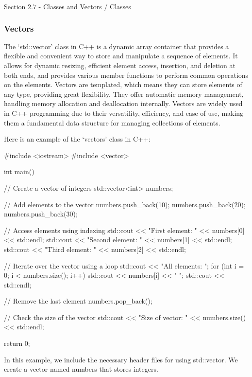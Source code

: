 \begin{notes}{Section 2.7 - Classes and Vectors / Classes}
    \subsubsection*{Vectors}

    The `std::vector' class in C++ is a dynamic array container that provides a flexible and convenient way to store and manipulate a sequence of elements. It allows for dynamic resizing, efficient element access, insertion, and deletion 
    at both ends, and provides various member functions to perform common operations on the elements. Vectors are templated, which means they can store elements of any type, providing great flexibility. They offer automatic memory management, 
    handling memory allocation and deallocation internally. Vectors are widely used in C++ programming due to their versatility, efficiency, and ease of use, making them a fundamental data structure for managing collections of elements.
    
    \begin{highlight}
        Here is an example of the `vectors' class in C++:
    \begin{code}[C++]
    #include <iostream>
    #include <vector>
    
    int main() {
        // Create a vector of integers
        std::vector<int> numbers;
    
        // Add elements to the vector
        numbers.push_back(10);
        numbers.push_back(20);
        numbers.push_back(30);
    
        // Access elements using indexing
        std::cout << "First element: " << numbers[0] << std::endl;
        std::cout << "Second element: " << numbers[1] << std::endl;
        std::cout << "Third element: " << numbers[2] << std::endl;
    
        // Iterate over the vector using a loop
        std::cout << "All elements: ";
        for (int i = 0; i < numbers.size(); i++) {
            std::cout << numbers[i] << " ";
        }
        std::cout << std::endl;
    
        // Remove the last element
        numbers.pop_back();
    
        // Check the size of the vector
        std::cout << "Size of vector: " << numbers.size() << std::endl;
    
        return 0;
    }        
    \end{code}
        In this example, we include the necessary header files for using std::vector. We create a vector named numbers that stores integers.
    

\end{highlight}
\end{notes}
